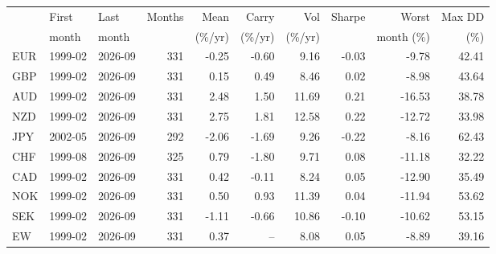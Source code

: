 \begin{tabular}{@{}lllrrrrrrr@{}}
\toprule
 & First & Last & Months & Mean & Carry & Vol & Sharpe & Worst & Max DD \\
 & month & month & & (\%/yr) & (\%/yr) & (\%/yr) & & month (\%) & (\%) \\
\midrule
EUR & 1999-02 & 2026-09 & 331 & -0.25 & -0.60 & 9.16 & -0.03 & -9.78 & 42.41 \\
GBP & 1999-02 & 2026-09 & 331 & 0.15 & 0.49 & 8.46 & 0.02 & -8.98 & 43.64 \\
AUD & 1999-02 & 2026-09 & 331 & 2.48 & 1.50 & 11.69 & 0.21 & -16.53 & 38.78 \\
NZD & 1999-02 & 2026-09 & 331 & 2.75 & 1.81 & 12.58 & 0.22 & -12.72 & 33.98 \\
JPY & 2002-05 & 2026-09 & 292 & -2.06 & -1.69 & 9.26 & -0.22 & -8.16 & 62.43 \\
CHF & 1999-08 & 2026-09 & 325 & 0.79 & -1.80 & 9.71 & 0.08 & -11.18 & 32.22 \\
CAD & 1999-02 & 2026-09 & 331 & 0.42 & -0.11 & 8.24 & 0.05 & -12.90 & 35.49 \\
NOK & 1999-02 & 2026-09 & 331 & 0.50 & 0.93 & 11.39 & 0.04 & -11.94 & 53.62 \\
SEK & 1999-02 & 2026-09 & 331 & -1.11 & -0.66 & 10.86 & -0.10 & -10.62 & 53.15 \\
\midrule
EW & 1999-02 & 2026-09 & 331 & 0.37 & -- & 8.08 & 0.05 & -8.89 & 39.16 \\
\bottomrule
\end{tabular}
